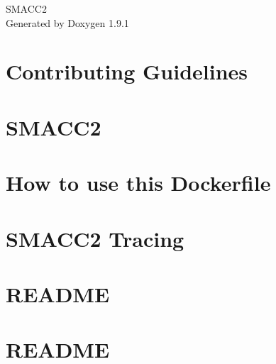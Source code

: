 \let\mypdfximage\pdfximage\def\pdfximage{\immediate\mypdfximage}\documentclass[twoside]{book}
\newcommand{\+}{\discretionary{\mbox{\scriptsize$\hookleftarrow$}}{}{}}
\newcommand{\clearemptydoublepage}{%
  \newpage{\pagestyle{empty}\cleardoublepage}%
}
\begin{document}
\raggedbottom

\hypersetup{pageanchor=false,
             bookmarksnumbered=true,
             pdfencoding=unicode
            }
\begin{titlepage}
\vspace*{7cm}
\begin{center}%
{\Large SMACC2 }\\
\vspace*{1cm}
{\large Generated by Doxygen 1.9.1}\\
\end{center}
\end{titlepage}
\clearemptydoublepage
{}
\tableofcontents
\clearemptydoublepage
{}
\hypersetup{pageanchor=true}

\chapter{Contributing Guidelines}
\label{md_CONTRIBUTING}

\chapter{SMACC2}
\label{md_README}

\chapter{How to use this Dockerfile}
\label{md_smacc2_ci_docker_ros_rollingAndGalactic_ubuntu_20_04_README}

\chapter{SMACC2 Tracing}
\label{md_smacc2_performance_tools_tracing_tools_README}

\chapter{README}
\label{md_smacc2_sm_reference_library__smacc2_sm_template_README}

\chapter{README}
\label{md_smacc2_sm_reference_library_sm_advanced_recovery_1_README}

\end{document}
